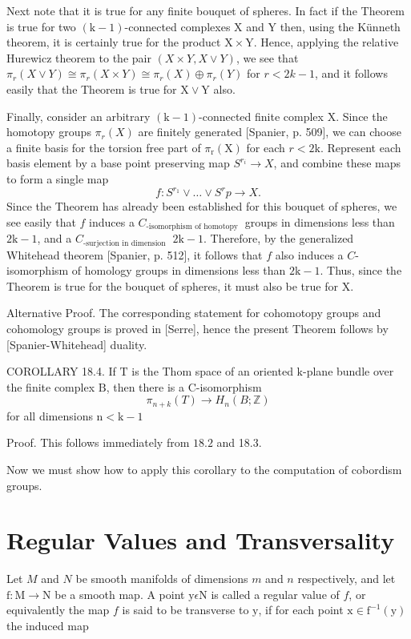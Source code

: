 \documentclass[10pt]{article}
\begin{document}
Next note that it is true for any finite bouquet of spheres. In fact if the Theorem is true for two $(\mathrm{k}-1)$-connected complexes $\mathrm{X}$ and $\mathrm{Y}$ then, using the Künneth theorem, it is certainly true for the product $\mathrm{X} \times \mathrm{Y}$. Hence, applying the relative Hurewicz theorem to the pair $(X \times Y, X \vee Y)$, we see that $\pi_{r}(X \vee Y) \cong \pi_{r}(X \times Y) \cong \pi_{r}(X) \oplus \pi_{r}(Y)$ for $r<2 k-1$, and it follows easily that the Theorem is true for $\mathrm{X} \vee \mathrm{Y}$ also.

Finally, consider an arbitrary $(\mathrm{k}-1)$-connected finite complex $\mathrm{X}$. Since the homotopy groups $\pi_{r}(X)$ are finitely generated [Spanier, p. 509], we can choose a finite basis for the torsion free part of $\pi_{\mathrm{r}}(\mathrm{X})$ for each $r<2 \mathrm{k}$. Represent each basis element by a base point preserving map $S^{r_{i}} \rightarrow X$, and combine these maps to form a single map
$$
f: S^{r_{1}} \vee \ldots \vee S^{r} p \rightarrow X .
$$
Since the Theorem has already been established for this bouquet of spheres, we see easily that $f$ induces a $C_{\text {-isomorphism of homotopy }}$ groups in dimensions less than $2 \mathrm{k}-1$, and a $C_{\text {-surjection in dimension }}$ $2 \mathrm{k}-1$. Therefore, by the generalized Whitehead theorem [Spanier, p. 512], it follows that $f$ also induces a $C$-isomorphism of homology groups in dimensions less than $2 \mathrm{k}-1$. Thus, since the Theorem is true for the bouquet of spheres, it must also be true for $\mathrm{X}$.

Alternative Proof. The corresponding statement for cohomotopy groups and cohomology groups is proved in [Serre], hence the present Theorem follows by [Spanier-Whitehead] duality.

COROLLARY 18.4. If $\mathrm{T}$ is the Thom space of an oriented $\mathrm{k}$-plane bundle over the finite complex $\mathrm{B}$, then there is a C-isomorphism
$$
\pi_{n+k}(T) \rightarrow H_{n}(B ; \mathbb{Z})
$$
for all dimensions $\mathrm{n}<\mathrm{k}-1$

Proof. This follows immediately from $18.2$ and 18.3.

Now we must show how to apply this corollary to the computation of cobordism groups.

\section{Regular Values and Transversality}
Let $M$ and $N$ be smooth manifolds of dimensions $m$ and $n$ respectively, and let $\mathrm{f}: \mathrm{M} \rightarrow \mathrm{N}$ be a smooth map. A point $\mathrm{y} \epsilon \mathrm{N}$ is called a regular value of $f$, or equivalently the map $f$ is said to be transverse to $\mathrm{y}$, if for each point $\mathrm{x} \in \mathrm{f}^{-1}(\mathrm{y})$ the induced map
\end{document}
